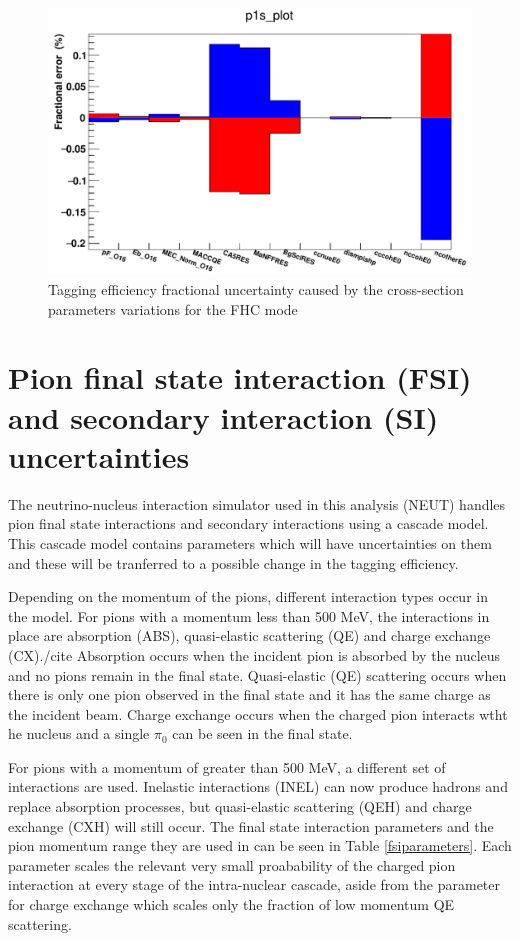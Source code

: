 \begin{figure}[h!]
    \includegraphics[scale=0.4]{Figures/xsec_uncertainty.png}
\caption{Tagging efficiency fractional uncertainty caused by the cross-section parameters variations for the FHC mode}
\label{fig:xsecuncertainty}
\end{figure}

\section{Pion final state interaction (FSI) and secondary interaction (SI) uncertainties}

The neutrino-nucleus interaction simulator used in this analysis (NEUT) handles pion final state interactions and secondary interactions using a cascade model. This cascade model contains parameters which will have uncertainties on them and these will be tranferred to a possible change in the tagging efficiency.

Depending on the momentum of the pions, different interaction types occur in the model. For pions with a momentum less than 500 MeV, the interactions in place are absorption (ABS), quasi-elastic scattering (QE) and charge exchange (CX)./cite{} Absorption occurs when the incident pion is absorbed by the nucleus and no pions remain in the final state. Quasi-elastic (QE) scattering occurs when there is only one pion observed in the final state and it has the same charge as the incident beam. Charge exchange occurs when the charged pion interacts wtht he nucleus and a single $\pi_{0}$ can be seen in the final state.


For pions with a momentum of greater than 500 MeV, a different set of interactions are used. Inelastic interactions (INEL) can now produce hadrons and replace absorption processes, but quasi-elastic scattering (QEH) and charge exchange (CXH) will still occur. The final state interaction parameters and the pion momentum range they are used in can be seen in Table \ref{fsiparameters}. Each parameter scales the relevant very small proabability of the charged pion interaction at every stage of the intra-nuclear cascade, aside from the parameter for charge exchange which scales only the fraction of low momentum QE scattering. 


